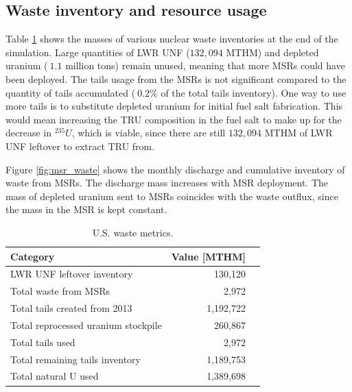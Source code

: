 \subsection{Waste inventory and resource usage}

Table \ref{tab:us_waste} shows the masses of various nuclear waste
inventories at the end of the simulation. Large quantities of \gls{LWR}
\gls{UNF} ($132,094$ MTHM) and depleted uranium ($~1.1$ million tons)
remain unused, meaning that more \glspl{MSR} could have been deployed.
The tails usage from the \glspl{MSR} is not significant compared to
the quantity of tails accumulated ($~0.2\%$ of the total tails inventory).
One way to use more tails
is to substitute depleted uranium for initial
fuel salt fabrication. This would mean increasing the \gls{TRU} composition
in the fuel salt to make up for the decrease in $^{235}U$, which is viable,
since there are still $132,094$ MTHM of \gls{LWR} \gls{UNF} leftover
to extract \gls{TRU} from.

Figure \ref{fig:msr_waste} shows the monthly discharge and cumulative
inventory of waste from \glspl{MSR}. The discharge mass increases with
\gls{MSR} deployment. The mass of depleted uranium sent to \glspl{MSR} coincides
with the waste outflux, since the mass in the \gls{MSR} is kept constant.

\begin{table}[h]
	\centering
	\caption{U.S. waste metrics.}
	\begin{tabular}{lrl}
		\hline
		\textbf{Category} & \textbf{Value [MTHM]} \\
		\hline
			\gls{LWR} \gls{UNF} leftover inventory & 130,120 \\
			Total waste from \gls{MSR}s & 2,972 \\
			Total tails created from 2013 & 1,192,722 \\
			Total reprocessed uranium stockpile & 260,867 \\
			Total tails used & 2,972 \\
			Total remaining tails inventory & 1,189,753 \\
			Total natural U used & 1,389,698 \\
		\hline
	\end{tabular}
	\label{tab:us_waste}
\end{table}


